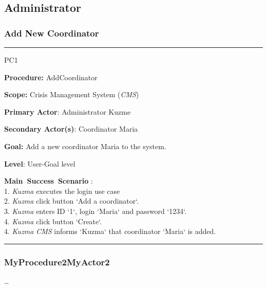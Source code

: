 \subsection{Administrator}

\subsubsection{Add New Coordinator}
\vspace{0.5cm}
\hrule
\begin{lyxlist}{PC1}
\small{
\item [\textbf{Procedure:}] AddCoordinator
\item [\textbf{Scope:}] Crisis Management System (\emph{CMS})
\item [\textbf{Primary Actor}:] Administrator Kuzme
\item [\textbf{Secondary Actor(s)}:] Coordinator Maria
\item [\textbf{Goal:}] Add a new coordinator Maria to the system.
\item [\textbf{Level}:] User-Goal level
\item [\textbf{Main~Success~Scenario}]:\\
1. \emph{Kuzma} executes the login use case\\
2. \emph{Kuzma} click button `Add a coordinator`.\\
3. \emph{Kuzma} enters ID `1`, login `Maria` and password `1234`. \\
4. \emph{Kuzma} click button `Create`. \\
4. \emph{Kuzma} \emph{CMS} informs `Kuzma` that coordinator `Maria` is added. 
}

\end{lyxlist}
\hrule
\vspace{0.5cm}

\subsubsection{MyProcedure2MyActor2}
\ldots














